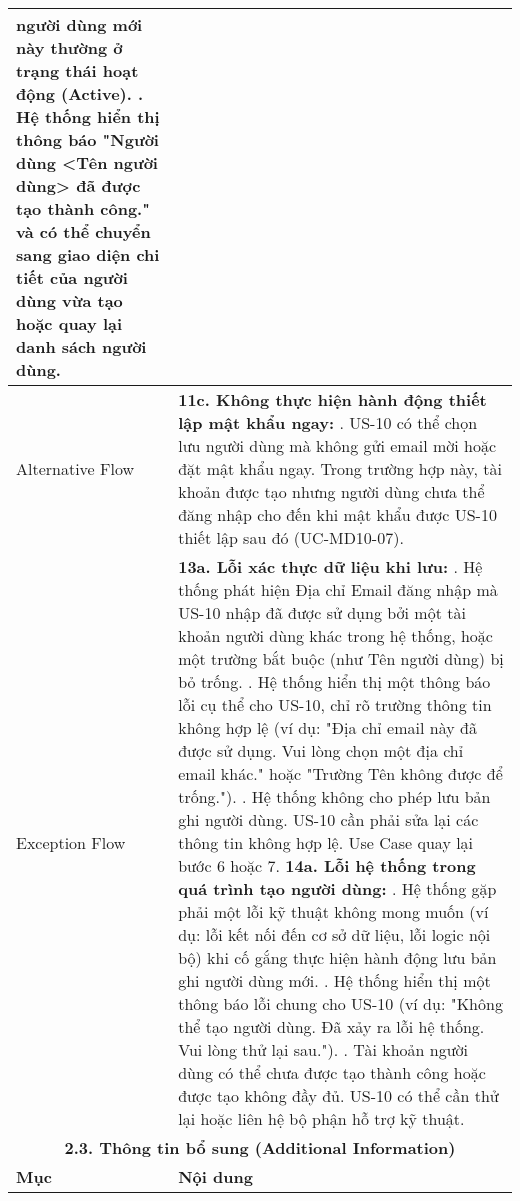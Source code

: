 \begin{longtable}{|m{4cm}|p{11cm}|}
người dùng mới này thường ở trạng thái hoạt động (Active). \newline 15. Hệ thống hiển thị thông báo "Người dùng <Tên người dùng> đã được tạo thành công." và có thể chuyển sang giao diện chi tiết của người dùng vừa tạo hoặc quay lại danh sách người dùng. \\
\hline
Alternative Flow & \textbf{11c. Không thực hiện hành động thiết lập mật khẩu ngay:} \newline    1. US-10 có thể chọn lưu người dùng mà không gửi email mời hoặc đặt mật khẩu ngay. Trong trường hợp này, tài khoản được tạo nhưng người dùng chưa thể đăng nhập cho đến khi mật khẩu được US-10 thiết lập sau đó (UC-MD10-07). \\
\hline
Exception Flow & \textbf{13a. Lỗi xác thực dữ liệu khi lưu:} \newline    1. Hệ thống phát hiện Địa chỉ Email đăng nhập mà US-10 nhập đã được sử dụng bởi một tài khoản người dùng khác trong hệ thống, hoặc một trường bắt buộc (như Tên người dùng) bị bỏ trống. \newline    2. Hệ thống hiển thị một thông báo lỗi cụ thể cho US-10, chỉ rõ trường thông tin không hợp lệ (ví dụ: "Địa chỉ email này đã được sử dụng. Vui lòng chọn một địa chỉ email khác." hoặc "Trường Tên không được để trống."). \newline    3. Hệ thống không cho phép lưu bản ghi người dùng. US-10 cần phải sửa lại các thông tin không hợp lệ. Use Case quay lại bước 6 hoặc 7. \newline \textbf{14a. Lỗi hệ thống trong quá trình tạo người dùng:} \newline    1. Hệ thống gặp phải một lỗi kỹ thuật không mong muốn (ví dụ: lỗi kết nối đến cơ sở dữ liệu, lỗi logic nội bộ) khi cố gắng thực hiện hành động lưu bản ghi người dùng mới. \newline    2. Hệ thống hiển thị một thông báo lỗi chung cho US-10 (ví dụ: "Không thể tạo người dùng. Đã xảy ra lỗi hệ thống. Vui lòng thử lại sau."). \newline    3. Tài khoản người dùng có thể chưa được tạo thành công hoặc được tạo không đầy đủ. US-10 có thể cần thử lại hoặc liên hệ bộ phận hỗ trợ kỹ thuật. \\
\hline
\multicolumn{2}{|c|}{\textbf{2.3. Thông tin bổ sung (Additional Information)}} \\
\hline
\textbf{Mục} & \textbf{Nội dung} \\
\hline

\end{longtable}
